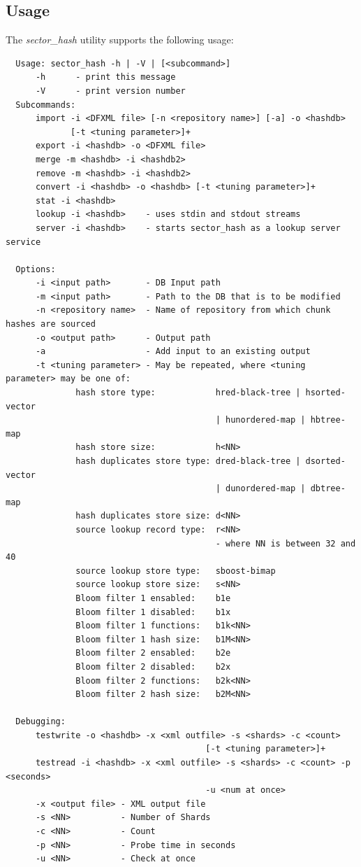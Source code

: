 \documentclass[10pt,twoside]{article}
\newcommand{\sh}{\emph{sector\_hash}\xspace}
\begin{document}
\subsection{Usage\label{usage}}
The \sh utility supports the following usage:
\begin{small}
\begin{verbatim}
  Usage: sector_hash -h | -V | [<subcommand>]
      -h      - print this message
      -V      - print version number
  Subcommands:
      import -i <DFXML file> [-n <repository name>] [-a] -o <hashdb>
             [-t <tuning parameter>]+
      export -i <hashdb> -o <DFXML file>
      merge -m <hashdb> -i <hashdb2>
      remove -m <hashdb> -i <hashdb2>
      convert -i <hashdb> -o <hashdb> [-t <tuning parameter>]+
      stat -i <hashdb>
      lookup -i <hashdb>    - uses stdin and stdout streams
      server -i <hashdb>    - starts sector_hash as a lookup server service

  Options:
      -i <input path>       - DB Input path
      -m <input path>       - Path to the DB that is to be modified
      -n <repository name>  - Name of repository from which chunk hashes are sourced
      -o <output path>      - Output path
      -a                    - Add input to an existing output
      -t <tuning parameter> - May be repeated, where <tuning parameter> may be one of:
              hash store type:            hred-black-tree | hsorted-vector
                                          | hunordered-map | hbtree-map
              hash store size:            h<NN>
              hash duplicates store type: dred-black-tree | dsorted-vector
                                          | dunordered-map | dbtree-map
              hash duplicates store size: d<NN>
              source lookup record type:  r<NN>
                                          - where NN is between 32 and 40
              source lookup store type:   sboost-bimap
              source lookup store size:   s<NN>
              Bloom filter 1 ensabled:    b1e
              Bloom filter 1 disabled:    b1x
              Bloom filter 1 functions:   b1k<NN>
              Bloom filter 1 hash size:   b1M<NN>
              Bloom filter 2 ensabled:    b2e
              Bloom filter 2 disabled:    b2x
              Bloom filter 2 functions:   b2k<NN>
              Bloom filter 2 hash size:   b2M<NN>

  Debugging:
      testwrite -o <hashdb> -x <xml outfile> -s <shards> -c <count>
                                        [-t <tuning parameter>]+
      testread -i <hashdb> -x <xml outfile> -s <shards> -c <count> -p <seconds>
                                        -u <num at once>
      -x <output file> - XML output file
      -s <NN>          - Number of Shards
      -c <NN>          - Count
      -p <NN>          - Probe time in seconds
      -u <NN>          - Check at once
\end{verbatim}
\end{small}
\end{document}
